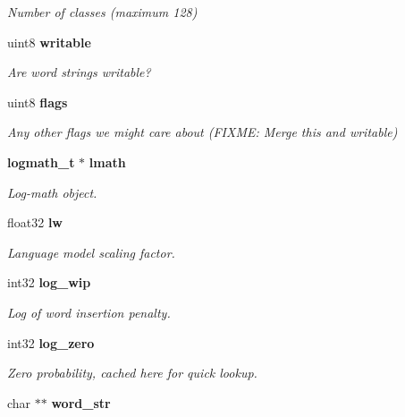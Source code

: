 \begin{DoxyCompactItemize}
\begin{DoxyCompactList}\small\item\em Number of classes (maximum 128) \end{DoxyCompactList}\item 
uint8 {\bf writable}\label{structngram__model__s_a78a3253febced2cae4732044da466ee6}

\begin{DoxyCompactList}\small\item\em Are word strings writable? \end{DoxyCompactList}\item 
uint8 {\bf flags}\label{structngram__model__s_ac609a2f867496d6ca719351d566db328}

\begin{DoxyCompactList}\small\item\em Any other flags we might care about (F\-I\-X\-M\-E\-: Merge this and writable) \end{DoxyCompactList}\item 
{\bf logmath\-\_\-t} $\ast$ {\bf lmath}\label{structngram__model__s_a2ca373109c651ac998b33153eb38fd95}

\begin{DoxyCompactList}\small\item\em Log-\/math object. \end{DoxyCompactList}\item 
float32 {\bf lw}\label{structngram__model__s_a76ea0c65b23de80091e7c602bdb43bde}

\begin{DoxyCompactList}\small\item\em Language model scaling factor. \end{DoxyCompactList}\item 
int32 {\bf log\-\_\-wip}\label{structngram__model__s_a3d6bf5632760a16e52cb881d7010d774}

\begin{DoxyCompactList}\small\item\em Log of word insertion penalty. \end{DoxyCompactList}\item 
int32 {\bf log\-\_\-zero}\label{structngram__model__s_a65425a599c4bcc4dda809d81149b8fc0}

\begin{DoxyCompactList}\small\item\em Zero probability, cached here for quick lookup. \end{DoxyCompactList}\item 
char $\ast$$\ast$ {\bf word\-\_\-str}\label{structngram__model__s_ae625e779e340845f03fb3da164e93039}


\end{DoxyCompactItemize}
